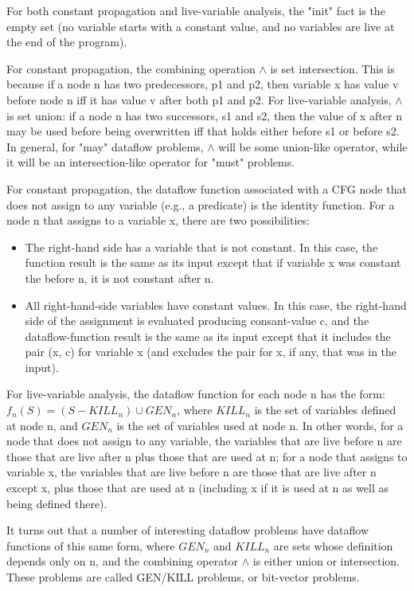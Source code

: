 For both constant propagation and live-variable analysis, the "init" fact is the empty set (no variable starts with a constant value, and no variables are live at the end of the program).

For constant propagation, the combining operation $\wedge$ is set intersection. This is because if a node n has two predecessors, p1 and p2, then variable x has value v before node n iff it has value v after both p1 and p2. For live-variable analysis, $\wedge$ is set union: if a node n has two successors, s1 and s2, then the value of x after n may be used before being overwritten iff that holds either before s1 or before s2. In general, for "may" dataflow problems, $\wedge$ will be some union-like operator, while it will be an intersection-like operator for "must" problems.

For constant propagation, the dataflow function associated with a CFG node that does not assign to any variable (e.g., a predicate) is the identity function. For a node n that assigns to a variable x, there are two possibilities:
\begin{itemize}
\item The right-hand side has a variable that is not constant. In this case, the function result is the same as its input except that if variable x was constant the before n, it is not constant after n.
\item All right-hand-side variables have constant values. In this case, the right-hand side of the assignment is evaluated producing consant-value c, and the dataflow-function result is the same as its input except that it includes the pair (x, c) for variable x (and excludes the pair for x, if any, that was in the input).

\end{itemize}	
For live-variable analysis, the dataflow function for each node n has 
the form: $f_n(S) = (S - KILL_n)  \cup  GEN_n$, where $KILL_n$
 is the set of variables defined at node n, and $GEN_n$ is the set 
 of variables used at node n. In other words, for a node
  that does not assign to any variable, the variables that
   are live before n are those that are live after n plus those 
   that are used at n; for a node that assigns to variable x, the 
   variables that are live before n are those that are live after 
   n except x, plus those that are used at n (including x if it 
   is used at n as well as being defined there).


   
It turns out that a number of interesting dataflow problems 
have dataflow functions of this same form, where $GEN_n$ and $KILL_n$
 are sets whose definition depends only on n, and the combining 
 operator $\wedge$ is either union or intersection. These problems 
 are called GEN/KILL problems, or bit-vector problems.

